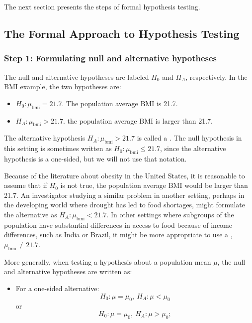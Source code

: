 \begin{spacing}{1.5}
The next section presents the steps of formal hypothesis testing.

\subsection{The Formal Approach to Hypothesis Testing}
\label{formalHypothesisTesting}


\subsubsection{Step 1: Formulating null and alternative hypotheses}

The null and alternative hypotheses are labeled $H_0$ and $H_A$, respectively.  In the BMI example, the two hypotheses are:

\begin{itemize}
	\item $H_0: \mu_{\text{bmi}} = 21.7$. The population average BMI is 21.7.
	
	\item $H_A: \mu_{\text{bmi}} > 21.7$. the population average BMI is larger than 21.7.
	
\end{itemize}	
The alternative hypothesis $H_A: \mu_{\text{bmi}} > 21.7$ is called a .  The null hypothesis in this setting is sometimes  written as $H_0: \mu_{\text{bmi}} \leq 21.7$, since the alternative hypothesis is a one-sided, but we will not use that notation.
	 

Because of the literature about obesity in the United States, it is reasonable to assume that if $H_0$ is not true, the population average BMI would be larger than 21.7.  An investigator studying a similar problem in another setting, perhaps in the developing world where drought has led to food shortages, might formulate the alternative as $ H_A:\mu_{\text{bmi}} < 21.7$. In other settings where subgroups of the population have  substantial differences in access to food because of income differences, such as India or Brazil, it might be more appropriate to use a , $\mu_{\text{bmi}} \neq 21.7$. 

More generally, when testing a hypothesis about a population mean $\mu$, the null and alternative hypotheses are written as:

\begin{itemize}
	\item For a one-sided alternative: \[H_0: \mu = \mu_0, \ H_A: \mu < \mu_0\] or \[H_0: \mu = \mu_0, \  H_A: \mu > \mu_0;\]
	

\end{itemize}
\end{spacing}
